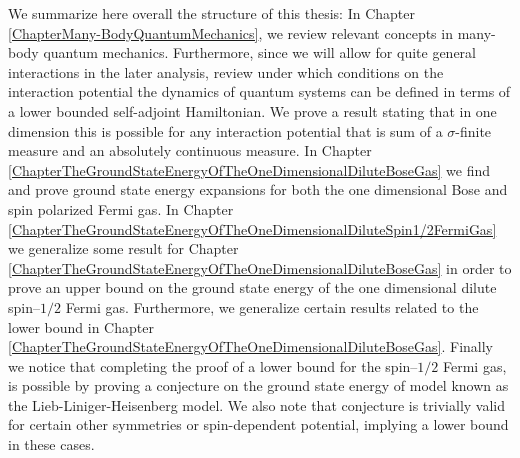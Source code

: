 We summarize here overall the structure of this thesis: In Chapter \ref{ChapterMany-BodyQuantumMechanics}, we review relevant concepts in many-body quantum mechanics. Furthermore, since we will allow for quite general interactions in the later analysis, review under which conditions on the interaction potential the dynamics of quantum systems can be defined in terms of a lower bounded self-adjoint Hamiltonian. We prove a result stating that in one dimension this is possible for any interaction potential that is sum of a $ \sigma $-finite measure and an absolutely continuous measure. In Chapter \ref{ChapterTheGroundStateEnergyOfTheOneDimensionalDiluteBoseGas} we find and prove ground state energy expansions for both the one dimensional Bose and spin polarized Fermi gas. In Chapter \ref{ChapterTheGroundStateEnergyOfTheOneDimensionalDiluteSpin1/2FermiGas} we generalize some result for Chapter \ref{ChapterTheGroundStateEnergyOfTheOneDimensionalDiluteBoseGas} in order to prove an upper bound on the ground state energy of the one dimensional dilute spin--$ 1/2 $ Fermi gas. Furthermore, we generalize certain results related to the lower bound in Chapter \ref{ChapterTheGroundStateEnergyOfTheOneDimensionalDiluteBoseGas}. Finally we notice that completing the proof of a lower bound for the spin--$ 1/2 $ Fermi gas, is possible by proving a conjecture on the ground state energy of model known as the Lieb-Liniger-Heisenberg model. We also note that conjecture is trivially valid for certain other symmetries or spin-dependent potential, implying a lower bound in these cases.

